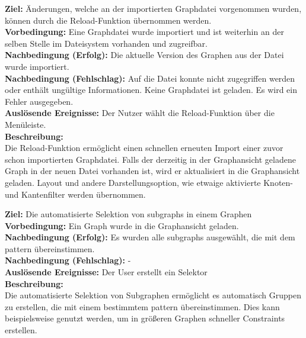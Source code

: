 \label{fa:reload}
\textbf{Ziel:} Änderungen, welche an der importierten Graphdatei vorgenommen wurden, können durch die Reload-Funktion übernommen werden.\\
\textbf{Vorbedingung:} Eine Graphdatei wurde importiert und ist weiterhin an der selben Stelle im Dateisystem vorhanden und zugreifbar.\\
\textbf{Nachbedingung (Erfolg):} Die aktuelle Version des Graphen aus der Datei wurde importiert.\\
\textbf{Nachbedingung (Fehlschlag):} Auf die Datei konnte nicht zugegriffen werden oder enthält ungültige Informationen. Keine Graphdatei ist geladen. Es wird ein Fehler ausgegeben.\\
\textbf{Auslösende Ereignisse:} Der Nutzer wählt die Reload-Funktion über die Menüleiste.\\
\textbf{Beschreibung:}\\
Die Reload-Funktion ermöglicht einen schnellen erneuten Import einer zuvor schon importierten Graphdatei.
Falls der derzeitig in der Graphansicht geladene Graph in der neuen Datei vorhanden ist, wird er aktualisiert in die Graphansicht geladen.
Layout und andere Darstellungsoption, wie etwaige aktivierte Knoten- und Kantenfilter werden übernommen.

\label{fa:gpm}
\textbf{Ziel:} Die automatisierte Selektion von \glspl{subgraph} in einem Graphen \\
\textbf{Vorbedingung:} Ein Graph wurde in die Graphansicht geladen.\\
\textbf{Nachbedingung (Erfolg):} Es wurden alle \glspl{subgraph} ausgewählt, die mit dem \gls{pattern} übereinstimmen.\\
\textbf{Nachbedingung (Fehlschlag):} - \\
\textbf{Auslösende Ereignisse:} Der User erstellt ein Selektor\\
\textbf{Beschreibung:}\\
Die automatisierte Selektion von Subgraphen ermöglicht es automatisch Gruppen zu erstellen, die mit einem bestimmtem \gls{pattern} übereinstimmen. Dies kann beispielsweise genutzt werden, um in größeren Graphen schneller Constraints erstellen.\\

